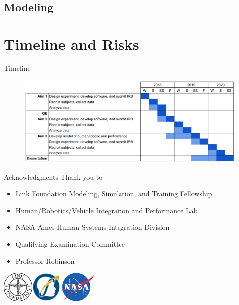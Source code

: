 \documentclass[10pt]{beamer}
\begin{document}
\subsection{Modeling}

\section{Timeline and Risks}

\begin{frame}[fragile]{Timeline}
  \begin{figure}[h!]
    \begin{center}
      \includegraphics[width=\linewidth]{../img/image1.png}
    \end{center}
  \end{figure}
\end{frame}

\begin{frame}[fragile]{Acknowledgments}
  Thank you to
  \begin{itemize}
    \item Link Foundation Modeling, Simulation, and Training Fellowship
    \item Human/Robotics/Vehicle Integration and Performance Lab
    \item NASA Ames Human Systems Integration Division
    \item Qualifying Examination Committee
    \item Professor Robinson
  \end{itemize}
  \hfill\includegraphics[height=1.5cm]{../img/linkfoundation.png}\includegraphics[height=1.5cm]{../img/hrvip.png}\includegraphics[height=1.5cm]{../img/nasa.png}
\end{frame}
\end{document}
